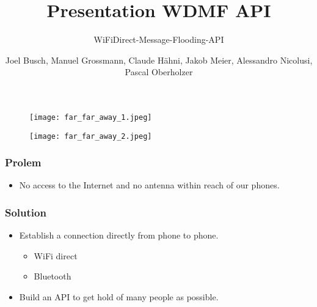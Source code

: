 \documentclass[11pt]{beamer}
\author{Joel Busch, Manuel Grossmann, Claude Hähni, Jakob Meier, Alessandro Nicolusi, Pascal Oberholzer}
\title{Presentation WDMF API}
\subtitle{WiFiDirect-Message-Flooding-API}
\institute{}
\date{}
\begin{document}
	\maketitle
	
	\begin{frame}
		\begin{figure}
			\texttt{[image: far\_far\_away\_1.jpeg]}
		\end{figure}
	\end{frame}
	
	\begin{frame}
		\begin{figure}
			\texttt{[image: far\_far\_away\_2.jpeg]}
		\end{figure}
	\end{frame}
	
	\begin{frame}
		\frametitle{Prolem}
		\begin{itemize}
			\item No access to the Internet and no antenna within reach of our phones.
		\end{itemize}
	\end{frame}
	
	\begin{frame}
		\frametitle{Solution}
		\begin{itemize}
			\item Establish a connection directly from phone to phone.
			\begin{itemize}
				\item WiFi direct
				\item Bluetooth
			\end{itemize}
			\item Build an API to get hold of many people as possible.
		\end{itemize}
	\end{frame}
	
\end{document}
